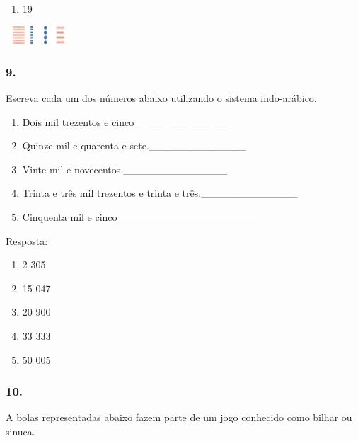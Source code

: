 \begin{enumerate}
\def\labelenumi{\alph{enumi})}
\item
  19
\end{enumerate}

\includegraphics[width=0.50004in,height=0.26669in]{media/image14.png}\includegraphics[width=0.43337in,height=0.25836in]{media/image20.png}

\subsubsection{9.}\label{section-8}

Escreva cada um dos números abaixo utilizando o sistema indo-arábico.

\begin{enumerate}
\def\labelenumi{\alph{enumi})}
\item
  Dois mil trezentos e cinco\_\_\_\_\_\_\_\_\_\_\_\_\_
\item
  Quinze mil e quarenta e sete.\_\_\_\_\_\_\_\_\_\_\_\_\_
\item
  Vinte mil e novecentos.\_\_\_\_\_\_\_\_\_\_\_\_\_\_
\item
  Trinta e três mil trezentos e trinta e três.\_\_\_\_\_\_\_\_\_\_\_\_\_
\item
  Cinquenta mil e cinco\_\_\_\_\_\_\_\_\_\_\_\_\_\_\_\_\_\_\_\_
\end{enumerate}

Resposta:

\begin{enumerate}
\def\labelenumi{\alph{enumi})}
\item
  2 305
\item
  15 047
\item
  20 900
\item
  33 333
\item
  50 005
\end{enumerate}

\subsubsection{10.}\label{section-9}

A bolas representadas abaixo fazem parte de um jogo conhecido como
bilhar ou sinuca.

